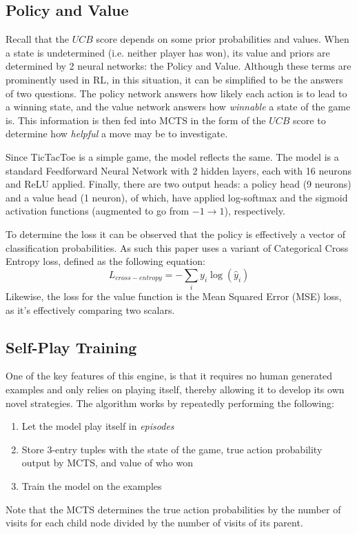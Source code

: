 
\subsection{Policy and Value}
Recall that the $UCB$ score depends on some prior probabilities and values. When a state is undetermined (i.e. neither player has won), its value and priors are determined by 2 neural networks: the Policy and Value. Although these terms are prominently used in RL, in this situation, it can be simplified to be the answers of two questions. The policy network answers how likely each action is to lead to a winning state, and the value network answers how \textit{winnable} a state of the game is. This information is then fed into MCTS in the form of the $UCB$ score to determine how \emph{helpful} a move may be to investigate.

Since TicTacToe is a simple game, the model reflects the same. The model is a standard Feedforward Neural Network with 2 hidden layers, each with 16 neurons and ReLU applied. Finally, there are two output heads: a policy head (9 neurons) and a value head (1 neuron), of which, have applied log-softmax and the sigmoid activation functions (augmented to go from $-1\to1$), respectively.

To determine the loss it can be observed that the policy is effectively a vector of classification probabilities. As such this paper uses a variant of Categorical Cross Entropy loss, defined as the following equation:
\begin{equation}
  L_{cross-entropy} = -\sum_{i}y_i\log(\hat y_i)
\end{equation}
Likewise, the loss for the value function is the Mean Squared Error (MSE) loss, as it's effectively comparing two scalars.

\subsection{Self-Play Training}
One of the key features of this engine, is that it requires no human generated examples and only relies on playing itself, thereby allowing it to develop its own novel strategies. The algorithm works by repeatedly performing the following:
\begin{enumerate}
  \item Let the model play itself in \emph{episodes}
  \item Store 3-entry tuples with the state of the game, true action probability output by MCTS, and  value of who won
  \item Train the model on the examples
\end{enumerate}
Note that the MCTS determines the true action probabilities by the number of visits for each child node divided by the number of visits of its parent.

